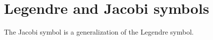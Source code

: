 \documentclass[12pt]{article}
\begin{document}
\section{Legendre and Jacobi symbols}
The Jacobi symbol is a generalization of the Legendre symbol.\\
\end{document}
